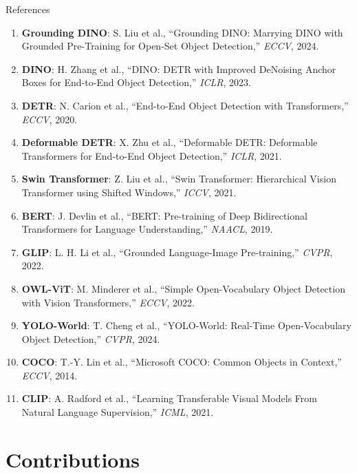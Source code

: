 \documentclass[aspectratio=169,10pt]{beamer}
\begin{document}
\begin{frame}{References}
  \footnotesize
  \renewcommand{\arraystretch}{1.4}
  \begin{enumerate}\setlength{\itemsep}{2pt}
    \item \textbf{Grounding DINO}: S. Liu et al., ``Grounding DINO: Marrying DINO with Grounded Pre-Training for Open-Set Object Detection,'' \textit{ECCV}, 2024.
    \item \textbf{DINO}: H. Zhang et al., ``DINO: DETR with Improved DeNoising Anchor Boxes for End-to-End Object Detection,'' \textit{ICLR}, 2023.
    \item \textbf{DETR}: N. Carion et al., ``End-to-End Object Detection with Transformers,'' \textit{ECCV}, 2020.
    \item \textbf{Deformable DETR}: X. Zhu et al., ``Deformable DETR: Deformable Transformers for End-to-End Object Detection,'' \textit{ICLR}, 2021.
    \item \textbf{Swin Transformer}: Z. Liu et al., ``Swin Transformer: Hierarchical Vision Transformer using Shifted Windows,'' \textit{ICCV}, 2021.
    \item \textbf{BERT}: J. Devlin et al., ``BERT: Pre-training of Deep Bidirectional Transformers for Language Understanding,'' \textit{NAACL}, 2019.
    \item \textbf{GLIP}: L. H. Li et al., ``Grounded Language-Image Pre-training,'' \textit{CVPR}, 2022.
    \item \textbf{OWL-ViT}: M. Minderer et al., ``Simple Open-Vocabulary Object Detection with Vision Transformers,'' \textit{ECCV}, 2022.
    \item \textbf{YOLO-World}: T. Cheng et al., ``YOLO-World: Real-Time Open-Vocabulary Object Detection,'' \textit{CVPR}, 2024.
    \item \textbf{COCO}: T.-Y. Lin et al., ``Microsoft COCO: Common Objects in Context,'' \textit{ECCV}, 2014.
    \item \textbf{CLIP}: A. Radford et al., ``Learning Transferable Visual Models From Natural Language Supervision,'' \textit{ICML}, 2021.
  \end{enumerate}
\end{frame}

\section{Contributions}
\end{document}
